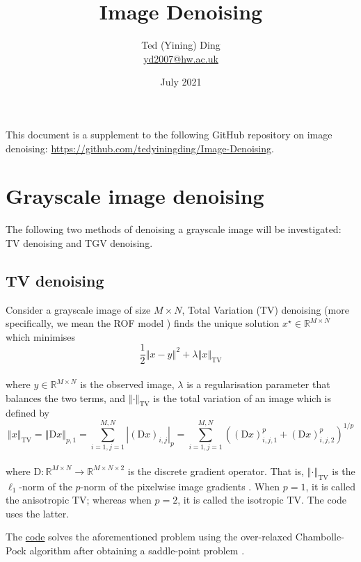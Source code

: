 \documentclass{article}
\title{Image Denoising}
\author{Ted (Yining) Ding\\
\href{mailto:yd2007@hw.ac.uk}{yd2007@hw.ac.uk}}
\date{July 2021}
\begin{document}
\maketitle

This document is a supplement to the following GitHub repository on image denoising: \url{https://github.com/tedyiningding/Image-Denoising}.

\section*{Grayscale image denoising} \label{sec:gray_denoising}
The following two methods of denoising a grayscale image will be investigated: TV denoising and TGV denoising.

\subsection*{TV denoising} \label{sec:tv_denoising}
Consider a grayscale image of size \(M \times N\), Total Variation (TV) denoising (more specifically, we mean the ROF model \cite{rudin1992nonlinear}) finds the unique solution \(x^\star \in \mathbb{R}^{M \times N}\) which minimises\\
%
\[\frac{1}{2} \left\Vert x-y \right\Vert ^2 + \lambda \left\Vert x \right\Vert_{\text{TV}}\]\\
%
where \(y \in \mathbb{R}^{M \times N}\) is the observed image, \(\lambda\) is a regularisation parameter that balances the two terms, and \(\left\Vert \cdot \right\Vert_{\text{TV}}\) is the total variation of an image which is defined by \\
%
\[\left\Vert x \right\Vert_{\text{TV}} = \left\Vert \mathrm{D} x \right\Vert_{p,1} = \sum_{i=1,j=1}^{M,N} \left| \left( \mathrm{D} x \right)_{i,j} \right|_p = \sum_{i=1,j=1}^{M,N} \left( \left( \mathrm{D} x \right)_{i,j,1}^p + \left( \mathrm{D} x \right)_{i,j,2}^p \right)^{1/p}\]\\
%
where \(\mathrm{D}: \mathbb{R}^{M \times N} \rightarrow \mathbb{R}^{M \times N \times 2}\) is the discrete gradient operator. That is, \(\left\Vert \cdot \right\Vert_{\text{TV}}\) is the \(\ell_1\)-norm of the \(p\)-norm of the pixelwise image gradients \cite[pp. 168]{chambolle2016introduction}. When \(p=1\), it is called the anisotropic TV; whereas when \(p=2\), it is called the isotropic TV. The code uses the latter.

The \href{https://github.com/tedyiningding/Image-Denoising/blob/main/TVdenoise.m}{code} solves the aforementioned problem using the over-relaxed Chambolle-Pock algorithm \cite[Algorithm 3.1]{condat2013primal} after obtaining a saddle-point problem \cite[Example 5.6]{chambolle2016introduction}.
\end{document}
